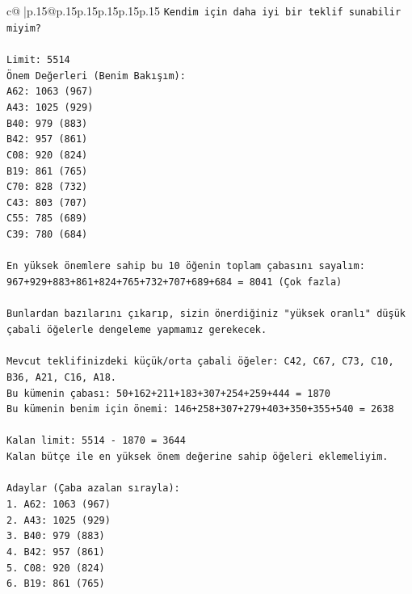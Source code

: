 \documentclass{article}
\begin{document}
{\begin{supertabular}{c@{$\;$}|p{.15\linewidth}@{}p{.15\linewidth}p{.15\linewidth}p{.15\linewidth}p{.15\linewidth}p{.15\linewidth}}
{{{\texttt{Kendim için daha iyi bir teklif sunabilir miyim?} \\
\\ 
\texttt{Limit: 5514} \\
\texttt{Önem Değerleri (Benim Bakışım):} \\
\texttt{A62: 1063 (967)} \\
\texttt{A43: 1025 (929)} \\
\texttt{B40: 979 (883)} \\
\texttt{B42: 957 (861)} \\
\texttt{C08: 920 (824)} \\
\texttt{B19: 861 (765)} \\
\texttt{C70: 828 (732)} \\
\texttt{C43: 803 (707)} \\
\texttt{C55: 785 (689)} \\
\texttt{C39: 780 (684)} \\
\\ 
\texttt{En yüksek önemlere sahip bu 10 öğenin toplam çabasını sayalım:} \\
\texttt{967+929+883+861+824+765+732+707+689+684 = 8041 (Çok fazla)} \\
\\ 
\texttt{Bunlardan bazılarını çıkarıp, sizin önerdiğiniz "yüksek oranlı" düşük çabali öğelerle dengeleme yapmamız gerekecek.} \\
\\ 
\texttt{Mevcut teklifinizdeki küçük/orta çabali öğeler: C42, C67, C73, C10, B36, A21, C16, A18.} \\
\texttt{Bu kümenin çabası: 50+162+211+183+307+254+259+444 = 1870} \\
\texttt{Bu kümenin benim için önemi: 146+258+307+279+403+350+355+540 = 2638} \\
\\ 
\texttt{Kalan limit: 5514 {-} 1870 = 3644} \\
\texttt{Kalan bütçe ile en yüksek önem değerine sahip öğeleri eklemeliyim.} \\
\\ 
\texttt{Adaylar (Çaba azalan sırayla):} \\
\texttt{1. A62: 1063 (967)} \\
\texttt{2. A43: 1025 (929)} \\
\texttt{3. B40: 979 (883)} \\
\texttt{4. B42: 957 (861)} \\
\texttt{5. C08: 920 (824)} \\
\texttt{6. B19: 861 (765)} \\
}}}
\end{supertabular}}
\end{document}
